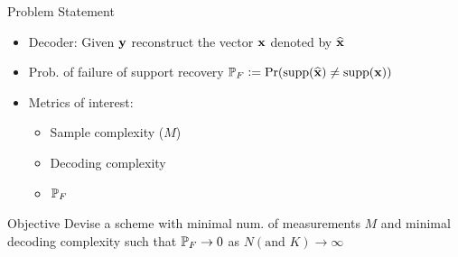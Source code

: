 \documentclass[10pt]{beamer}
\begin{document}
\begin{frame}{Problem Statement}
\begin{itemize}
\item Decoder: Given $\mathbf{y}$ reconstruct the vector $\mathbf{x}$ denoted by $\widehat{\mathbf{x}}$
\item Prob. of failure of support recovery $\mathbb{P}_{F}\mathrel{\mathop:}= \text{Pr}(\text{supp}(\widehat{\mathbf{x}})\neq \text{supp}(\mathbf{x}))$
\item Metrics of interest:
\begin{itemize}
\item Sample complexity ($M$)
\item Decoding complexity
\item $\mathbb{P}_{F}$
\end{itemize} 
\end{itemize}
\vspace{5ex}

\begin{block}{Objective}
Devise a scheme with minimal num. of measurements $M$ and minimal decoding complexity such that $\mathbb{P}_{F}\rightarrow 0$ as $N (\text{and } K) \rightarrow \infty$
\end{block}
\end{frame}
\end{document}
